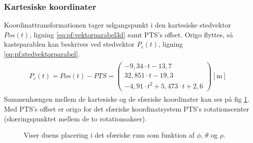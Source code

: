 \subsubsection{Kartesiske koordinater}
Koordinattransformationen tager udgangspunkt i den kartesiske stedvektor \(Pos\left(t\right) \), ligning \ref{eq:pf:vektorparabel3d} samt PTS's offset.
Origo flyttes, så kasteparablen kan beskrives ved stedvektor \(P_c\left(t\right)\), ligning \ref{eq:pf:stedvektorparabel}.
\begin{align}
\begin{split}
{ P }_{ c }\left(t\right)=Pos\left( t \right) -PTS = \left( \begin{matrix} - 9,34\cdot t-13,7 \\32,851\cdot t-19,3
\\-{ 4,91\cdot t }^{ 2 }+5,473\cdot t+2,6\end{matrix} \right) [\text{m}]
\label{eq:pf:stedvektorparabel}
\end{split}
\end{align}
Sammenhængen mellem de kartesiske og de sfæriske koordinater kan ses på fig \ref{fig:thetaphi_degree}. 
Med PTS's offset er origo for det sfæriske koordinatsystem PTS's rotationscenter (skæringspunktet mellem de to rotationsakser).

\begin{figure}[!th]
\centering
\begin{tikzpicture}[scale=4]

\end{tikzpicture}
\caption[Sfærisk koordinatsystem til koordinattransformation]{Viser duens placering i det sfæriske rum som funktion af  \(\phi\), \(\theta\) og \(\rho\).}
\label{fig:thetaphi_degree}
\end{figure}

